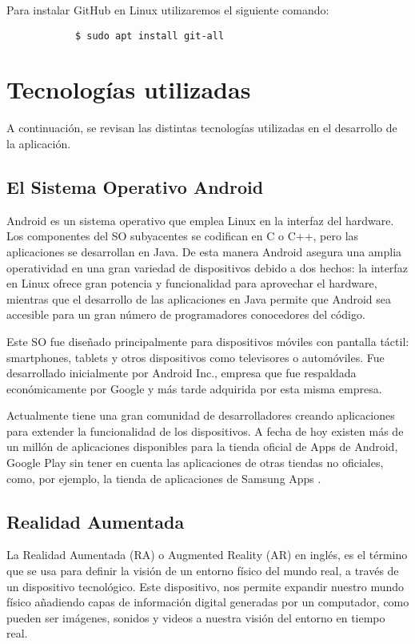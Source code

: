         Para instalar GitHub en Linux utilizaremos el siguiente comando:
        \begin{lstlisting}
            $ sudo apt install git-all
        \end{lstlisting}

\section{Tecnologías utilizadas}

A continuación, se revisan las distintas tecnologías utilizadas en el desarrollo de la aplicación.

\subsection{El Sistema Operativo Android}

Android es un sistema operativo que emplea Linux en la interfaz del hardware.  Los componentes del SO subyacentes se codifican en C o C++, pero las aplicaciones se desarrollan en Java. De esta manera Android asegura una amplia operatividad en una gran variedad de dispositivos debido a dos hechos: la interfaz en Linux ofrece gran potencia y funcionalidad para aprovechar el hardware, mientras que el desarrollo de las aplicaciones en Java permite que Android sea accesible para un gran número de programadores conocedores del código.

Este SO fue diseñado principalmente para dispositivos móviles con pantalla táctil: smartphones, tablets y otros dispositivos como televisores o automóviles. Fue desarrollado inicialmente por Android Inc., empresa que fue respaldada económicamente por Google y más tarde adquirida por esta misma empresa.

Actualmente tiene una gran comunidad de desarrolladores creando aplicaciones para extender la funcionalidad de los dispositivos. A fecha de hoy existen más de un millón de aplicaciones disponibles para la tienda oficial de Apps de Android, Google Play \cite{URL::GooglePlay} sin tener en cuenta las aplicaciones de otras tiendas no oficiales, como, por ejemplo, la tienda de aplicaciones de Samsung Apps \cite{URL::SamsungApps}. 

\subsection{Realidad Aumentada}

La Realidad Aumentada (RA) o Augmented Reality (AR) en inglés, es el término que se usa para definir la visión de un entorno físico del mundo real, a través de un dispositivo tecnológico. Este dispositivo, nos permite expandir nuestro mundo físico añadiendo capas de información digital generadas por un computador, como pueden ser imágenes, sonidos y videos a nuestra visión del entorno en tiempo real. 

